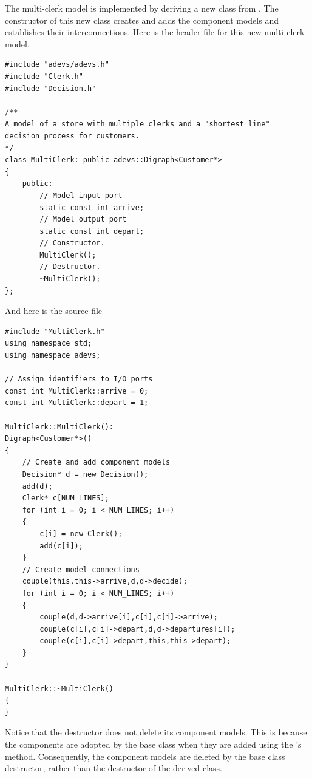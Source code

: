 The multi-clerk model is implemented by deriving a new class from . The constructor of this new class creates and adds the component models and establishes their interconnections. Here is the header file for this new multi-clerk model.
\begin{verbatim}
#include "adevs/adevs.h"
#include "Clerk.h"
#include "Decision.h"

/**
A model of a store with multiple clerks and a "shortest line"
decision process for customers.
*/
class MultiClerk: public adevs::Digraph<Customer*>
{
    public:
        // Model input port
        static const int arrive;
        // Model output port
        static const int depart;
        // Constructor.
        MultiClerk();
        // Destructor.
        ~MultiClerk();
};
\end{verbatim}
And here is the source file
\begin{verbatim}
#include "MultiClerk.h"
using namespace std;
using namespace adevs;

// Assign identifiers to I/O ports
const int MultiClerk::arrive = 0;
const int MultiClerk::depart = 1;

MultiClerk::MultiClerk():
Digraph<Customer*>()
{
    // Create and add component models
    Decision* d = new Decision();
    add(d);
    Clerk* c[NUM_LINES];
    for (int i = 0; i < NUM_LINES; i++)
    {
        c[i] = new Clerk();
        add(c[i]);
    }
    // Create model connections
    couple(this,this->arrive,d,d->decide);
    for (int i = 0; i < NUM_LINES; i++)
    {
        couple(d,d->arrive[i],c[i],c[i]->arrive);
        couple(c[i],c[i]->depart,d,d->departures[i]);
        couple(c[i],c[i]->depart,this,this->depart);
    }
}

MultiClerk::~MultiClerk()
{
}
\end{verbatim}
Notice that the  destructor does not delete its component models. This is because the components are adopted by the base class when they are added using the 's  method. Consequently, the component models are deleted by the base class destructor, rather than the destructor of the derived class.

